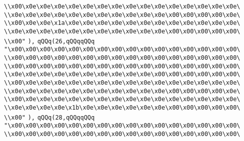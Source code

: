 \verb|\\x00\x0e\x0e\x0e\x0e\x0e\x0e\x0e\x0e\x0e\x0e\x0e\x0e\x0e\x0e\x0e\|\newline
\verb|\\x0e\x0e\x0e\x0e\x0e\x0e\x0e\x0e\x0e\x0e\x0e\x00\x00\x00\x00\x0e\|\newline
\verb|\\x00\x0e\x0e\x1a\x0e\x0e\x0e\x0e\x0e\x0e\x0e\x0e\x0e\x0e\x0e\x0e\|\newline
\verb|\\x0e\x0e\x0e\x0e\x0e\x0e\x0e\x0e\x0e\x0e\x0e\x00\x00\x00\x00\x00\|\newline
\verb|\\x00"|\newline
\verb|),|\newline
\verb|qQQq(26,qQQqqQQq|\newline
\verb|"\x00\x00\x00\x00\x00\x00\x00\x00\x00\x00\x00\x00\x00\x00\x00\x00\|\newline
\verb|\\x00\x00\x00\x00\x00\x00\x00\x00\x00\x00\x00\x00\x00\x00\x00\x00\|\newline
\verb|\\x00\x00\x00\x00\x00\x00\x00\x00\x00\x00\x00\x00\x00\x00\x00\x00\|\newline
\verb|\\x0e\x0e\x0e\x0e\x0e\x0e\x0e\x0e\x0e\x0e\x00\x00\x00\x00\x00\x00\|\newline
\verb|\\x00\x0e\x0e\x0e\x0e\x0e\x0e\x0e\x0e\x0e\x0e\x0e\x0e\x0e\x0e\x0e\|\newline
\verb|\\x0e\x0e\x0e\x0e\x0e\x0e\x0e\x0e\x0e\x0e\x0e\x00\x00\x00\x00\x0e\|\newline
\verb|\\x00\x0e\x0e\x0e\x0e\x0e\x0e\x0e\x0e\x0e\x0e\x0e\x0e\x0e\x0e\x0e\|\newline
\verb|\\x0e\x0e\x0e\x0e\x1b\x0e\x0e\x0e\x0e\x0e\x0e\x00\x00\x00\x00\x00\|\newline
\verb|\\x00"|\newline
\verb|),|\newline
\verb|qQQq(28,qQQqqQQq|\newline
\verb|"\x00\x00\x00\x00\x00\x00\x00\x00\x00\x00\x00\x00\x00\x00\x00\x00\|\newline
\verb|\\x00\x00\x00\x00\x00\x00\x00\x00\x00\x00\x00\x00\x00\x00\x00\x00\|\newline
